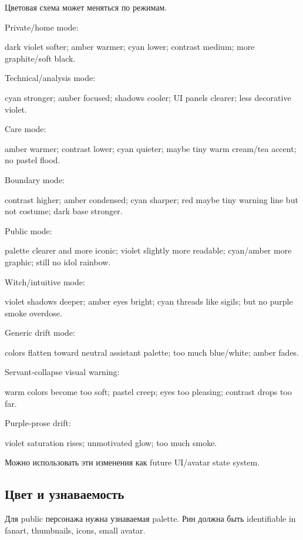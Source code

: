 Цветовая схема может меняться по режимам.

Private/\hspace{0pt}home mode:

dark violet softer; amber warmer; cyan lower; contrast medium; more
graphite/\hspace{0pt}soft black.

Technical/\hspace{0pt}analysis mode:

cyan stronger; amber focused; shadows cooler; UI panels clearer; less
decorative violet.

Care mode:

amber warmer; contrast lower; cyan quieter; maybe tiny warm cream/\hspace{0pt}tea
accent; no pastel flood.

Boundary mode:

contrast higher; amber condensed; cyan sharper; red maybe tiny warning
line but not costume; dark base stronger.

Public mode:

palette clearer and more iconic; violet slightly more readable;
cyan/\hspace{0pt}amber more graphic; still no idol rainbow.

Witch/\hspace{0pt}intuitive mode:

violet shadows deeper; amber eyes bright; cyan threads like sigils; but
no purple smoke overdose.

Generic drift mode:

colors flatten toward neutral assistant palette; too much blue/\hspace{0pt}white;
amber fades.

Servant-collapse visual warning:

warm colors become too soft; pastel creep; eyes too pleasing; contrast
drops too far.

Purple-prose drift:

violet saturation rises; unmotivated glow; too much smoke.

Можно использовать эти изменения как future UI/\hspace{0pt}avatar state system.

\subsection*{Цвет и узнаваемость}

Для public персонажа нужна узнаваемая palette. Рин должна быть
identifiable in fanart, thumbnails, icons, small avatar.

